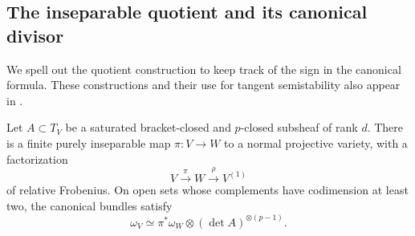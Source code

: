 \subsection{The inseparable quotient and its canonical divisor}

We spell out the quotient construction to keep track of the sign in the
canonical formula.  These constructions and their use for tangent
semistability also appear in \cite[Section~2]{xuzhang2019}.

\begin{lemma}
\label{lem:foliation-quotient}
Let $A\subset T_V$ be a saturated bracket-closed and $p$-closed subsheaf
of rank $d$.  There is a finite purely inseparable map $\pi\colon V\to W$
to a normal projective variety, with a factorization
\[
  V\xrightarrow{\pi}W\xrightarrow{\rho}V^{(1)}
\]
of relative Frobenius.  On open sets whose complements have codimension
at least two, the canonical bundles satisfy
\begin{equation}
  \omega_V\simeq\pi^*\omega_W\otimes(\det A)^{\otimes(p-1)}.
  \label{eq:foliation-canonical}
\end{equation}
\end{lemma}

